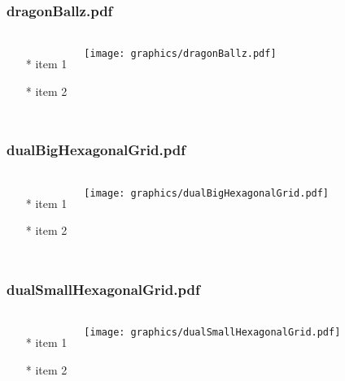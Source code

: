 \begin{frame} \frametitle{dragonBallz.pdf}
    \begin{columns}[c]
        \begin{itemize}
            \item[*] item 1
            \item[*] item 2
        \end{itemize}
        \begin{minipage}{\linewidth}
            \begin{center}
            \texttt{[image: graphics/dragonBallz.pdf]}
            \label{gfx:dragonBallz.pdf}
            \end{center}
        \end{minipage}
    \end{columns}
\end{frame}
\begin{frame} \frametitle{dualBigHexagonalGrid.pdf}
    \begin{columns}[c]
        \begin{itemize}
            \item[*] item 1
            \item[*] item 2
        \end{itemize}
        \begin{minipage}{\linewidth}
            \begin{center}
            \texttt{[image: graphics/dualBigHexagonalGrid.pdf]}
            \label{gfx:dualBigHexagonalGrid.pdf}
            \end{center}
        \end{minipage}
    \end{columns}
\end{frame}
\begin{frame} \frametitle{dualSmallHexagonalGrid.pdf}
    \begin{columns}[c]
        \begin{itemize}
            \item[*] item 1
            \item[*] item 2
        \end{itemize}
        \begin{minipage}{\linewidth}
            \begin{center}
            \texttt{[image: graphics/dualSmallHexagonalGrid.pdf]}
            \label{gfx:dualSmallHexagonalGrid.pdf}
            \end{center}
        \end{minipage}
    \end{columns}
\end{frame}
